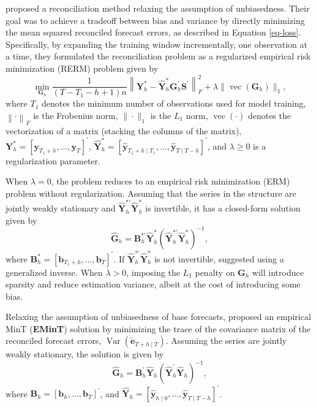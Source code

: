\documentclass[
  11pt]{article}
\theoremstyle{plain}
\theoremstyle{remark}
\begin{document}
\citet{Ben_Taieb2019-be} proposed a reconciliation method relaxing the
assumption of unbiasedness. Their goal was to achieve a tradeoff between
bias and variance by directly minimizing the mean squared reconciled
forecast errors, as described in Equation \eqref{eq-loss}. Specifically,
by expanding the training window incrementally, one observation at a
time, they formulated the reconciliation problem as a regularized
empirical risk minimization (RERM) problem given by \[
\min_{\bm{G}_h} \frac{1}{(T-T_1-h+1)n}\left\|\bm{Y}_{h}^{*}-\hat{\bm{Y}}_{h}^{*} \bm{G}_{h}^{\prime} \bm{S}^{\prime}\right\|_F^2+\lambda\|\operatorname{vec}( \bm{G}_h)\|_1,
\] where \(T_1\) denotes the minimum number of observations used for
model training, \(\left\| \cdot \right\|_F\) is the Frobenius norm,
\(\|\cdot\|_1\) is the \(L_1\) norm, \(\operatorname{vec}(\cdot)\)
denotes the vectorization of a matrix (stacking the columns of the
matrix),
\(\bm{Y}_{h}^{*}=\left[\bm{y}_{T_1+h}, \ldots, \bm{y}_T\right]^{\prime}\),
\(\hat{\bm{Y}}_{h}^{*}=\left[\hat{\bm{y}}_{T_1+h \mid T_1}, \ldots, \hat{\bm{y}}_{T \mid T-h}\right]^{\prime}\),
and \(\lambda \geq 0\) is a regularization parameter.

When \(\lambda = 0\), the problem reduces to an empirical risk
minimization (ERM) problem without regularization. Assuming that the
series in the structure are jointly weakly stationary and
\(\hat{\bm{Y}}_{h}^{*\prime}\hat{\bm{Y}}_{h}^{*}\) is invertible, it has
a closed-form solution given by \[
\hat{\bm{G}}_h = \bm{B}_{h}^{*\prime}\hat{\bm{Y}}_{h}^{*}\left(\hat{\bm{Y}}_{h}^{*\prime}\hat{\bm{Y}}_{h}^{*}\right)^{-1},
\] where
\(\bm{B}_{h}^{*}=\left[\bm{b}_{T_1+h}, \ldots, \bm{b}_T\right]^{\prime}\).
If \(\hat{\bm{Y}}_{h}^{*\prime}\hat{\bm{Y}}_{h}^{*}\) is not invertible,
\citet{Ben_Taieb2019-be} suggested using a generalized inverse. When
\(\lambda > 0\), imposing the \(L_1\) penalty on \(\bm{G}_h\) will
introduce sparsity and reduce estimation variance, albeit at the cost of
introducing some bias.

Relaxing the assumption of unbiasedness of base forecasts,
\citet{Wickramasuriya2021-am} proposed an empirical MinT
(\textbf{EMinT}) solution by minimizing the trace of the covariance
matrix of the reconciled forecast errors,
\(\operatorname{Var}(\tilde{\bm{e}}_{T+h \mid T})\). Assuming the series
are jointly weakly stationary, the solution is given by \[
\hat{\bm{G}}_{h} = \bm{B}_{h}^{\prime}\hat{\bm{Y}}_{h}\left(\hat{\bm{Y}}_{h}^{\prime}\hat{\bm{Y}}_{h}\right)^{-1},
\] where
\(\bm{B}_{h}=\left[\bm{b}_{h}, \ldots, \bm{b}_T\right]^{\prime}\), and
\(\hat{\bm{Y}}_{h}=\left[\hat{\bm{y}}_{h \mid 0}, \ldots, \hat{\bm{y}}_{T \mid T-h}\right]^{\prime}\).
\end{document}
